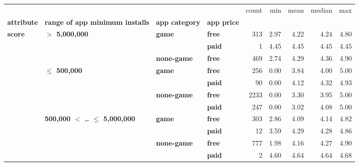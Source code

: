 \begin{tabular}{llll|rrrrr}
\toprule
      &                                 &           &      &  count &        min &       mean &     median &          max \\
\textbf{attribute} & \textbf{range of app minimum installs} & \textbf{app category} & \textbf{app price} &        &            &            &            &              \\
\midrule
\multirow{11}{*}{\textbf{score}} & \multirow{3}{*}{\textbf{$>$ 5,000,000}} & \multirow{2}{*}{\textbf{game}} & \textbf{free} &    313 &       2.97 &       4.22 &       4.24 &         4.80 \\
      &                                 &           & \textbf{paid} &      1 &       4.45 &       4.45 &       4.45 &         4.45 \\
\cline{3-9}
      &                                 & \textbf{none-game} & \textbf{free} &    469 &       2.74 &       4.29 &       4.36 &         4.90 \\
\cline{2-9}
      & \multirow{4}{*}{\textbf{$\leq$ 500,000}} & \multirow{2}{*}{\textbf{game}} & \textbf{free} &    256 &       0.00 &       3.84 &       4.00 &         5.00 \\
      &                                 &           & \textbf{paid} &     90 &       0.00 &       4.12 &       4.32 &         4.93 \\
\cline{3-9}
      &                                 & \multirow{2}{*}{\textbf{none-game}} & \textbf{free} &   2233 &       0.00 &       3.30 &       3.95 &         5.00 \\
      &                                 &           & \textbf{paid} &    247 &       0.00 &       3.02 &       4.08 &         5.00 \\
\cline{2-9}
\cline{3-9}
      & \multirow{4}{*}{\textbf{500,000 $<$ .. $\leq$ 5,000,000}} & \multirow{2}{*}{\textbf{game}} & \textbf{free} &    303 &       2.86 &       4.09 &       4.14 &         4.82 \\
      &                                 &           & \textbf{paid} &     12 &       3.59 &       4.29 &       4.28 &         4.86 \\
\cline{3-9}
      &                                 & \multirow{2}{*}{\textbf{none-game}} & \textbf{free} &    777 &       1.98 &       4.16 &       4.27 &         4.90 \\
      &                                 &           & \textbf{paid} &      2 &       4.60 &       4.64 &       4.64 &         4.68 \\

\end{tabular}
